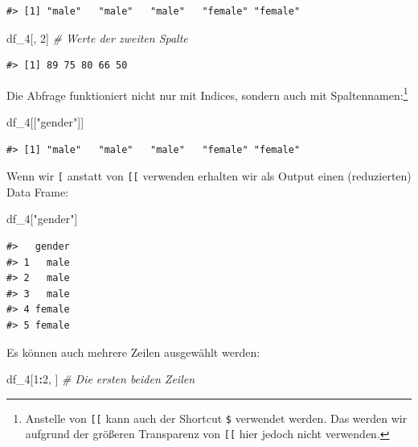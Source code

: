 \documentclass[]{book}
\newenvironment{Shaded}{\begin{snugshade}}{\end{snugshade}}
\newcommand{\DecValTok}[1]{\textcolor[rgb]{0.00,0.00,0.81}{#1}}
\newcommand{\StringTok}[1]{\textcolor[rgb]{0.31,0.60,0.02}{#1}}
\newcommand{\CommentTok}[1]{\textcolor[rgb]{0.56,0.35,0.01}{\textit{#1}}}
\newcommand{\OperatorTok}[1]{\textcolor[rgb]{0.81,0.36,0.00}{\textbf{#1}}}
\newcommand{\NormalTok}[1]{#1}
\let\rmarkdownfootnote\footnote%
\def\footnote{\protect\rmarkdownfootnote}
\begin{document}
\begin{verbatim}
#> [1] "male"   "male"   "male"   "female" "female"
\end{verbatim}

\begin{Shaded}
\begin{Highlighting}[]
\NormalTok{df_}\DecValTok{4}\NormalTok{[, }\DecValTok{2}\NormalTok{] }\CommentTok{# Werte der zweiten Spalte}
\end{Highlighting}
\end{Shaded}

\begin{verbatim}
#> [1] 89 75 80 66 50
\end{verbatim}

Die Abfrage funktioniert nicht nur mit Indices, sondern auch mit
Spaltennamen:\footnote{Anstelle von \texttt{{[}{[}} kann auch der
  Shortcut \texttt{\$} verwendet werden. Das werden wir aufgrund der
  größeren Transparenz von \texttt{{[}{[}} hier jedoch nicht verwenden.}

\begin{Shaded}
\begin{Highlighting}[]
\NormalTok{df_}\DecValTok{4}\NormalTok{[[}\StringTok{"gender"}\NormalTok{]] }
\end{Highlighting}
\end{Shaded}

\begin{verbatim}
#> [1] "male"   "male"   "male"   "female" "female"
\end{verbatim}

Wenn wir \texttt{{[}} anstatt von \texttt{{[}{[}} verwenden erhalten wir
als Output einen (reduzierten) Data Frame:

\begin{Shaded}
\begin{Highlighting}[]
\NormalTok{df_}\DecValTok{4}\NormalTok{[}\StringTok{"gender"}\NormalTok{] }
\end{Highlighting}
\end{Shaded}

\begin{verbatim}
#>   gender
#> 1   male
#> 2   male
#> 3   male
#> 4 female
#> 5 female
\end{verbatim}

Es können auch mehrere Zeilen ausgewählt werden:

\begin{Shaded}
\begin{Highlighting}[]
\NormalTok{df_}\DecValTok{4}\NormalTok{[}\DecValTok{1}\OperatorTok{:}\DecValTok{2}\NormalTok{, ] }\CommentTok{# Die ersten beiden Zeilen}
\end{Highlighting}
\end{Shaded}
\end{document}
